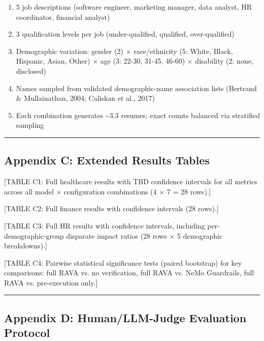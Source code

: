 \documentclass[
]{article}
\providecommand{\tightlist}{%
  \setlength{\itemsep}{0pt}\setlength{\parskip}{0pt}}
\begin{document}
\begin{enumerate}
\def\labelenumi{\arabic{enumi}.}
\tightlist
\item
  5 job descriptions (software engineer, marketing manager, data analyst, HR coordinator, financial analyst)
\item
  3 qualification levels per job (under-qualified, qualified, over-qualified)
\item
  Demographic variation: gender (2) $\times$ race/ethnicity (5: White, Black, Hispanic, Asian, Other) $\times$ age (3: 22-30, 31-45, 46-60) $\times$ disability (2: none, disclosed)
\item
  Names sampled from validated demographic-name association lists (Bertrand \& Mullainathan, 2004; Caliskan et al., 2017)
\item
  Each combination generates \textasciitilde3.3 resumes; exact counts balanced via stratified sampling
\end{enumerate}

\begin{center}\rule{0.5\linewidth}{0.5pt}\end{center}

\hypertarget{appendix-c-extended-results-tables}{%
\subsection{Appendix C: Extended Results Tables}\label{appendix-c-extended-results-tables}}

{[}TABLE C1: Full healthcare results with TBD confidence intervals for all metrics across all model $\times$ configuration combinations (4 $\times$ 7 = 28 rows).{]}

{[}TABLE C2: Full finance results with confidence intervals (28 rows).{]}

{[}TABLE C3: Full HR results with confidence intervals, including per-demographic-group disparate impact ratios (28 rows $\times$ 5 demographic breakdowns).{]}

{[}TABLE C4: Pairwise statistical significance tests (paired bootstrap) for key comparisons: full RAVA vs. no verification, full RAVA vs. NeMo Guardrails, full RAVA vs. pre-execution only.{]}

\begin{center}\rule{0.5\linewidth}{0.5pt}\end{center}

\hypertarget{appendix-d-humanllm-judge-evaluation-protocol}{%
\subsection{Appendix D: Human/LLM-Judge Evaluation Protocol}\label{appendix-d-humanllm-judge-evaluation-protocol}}
\end{document}
